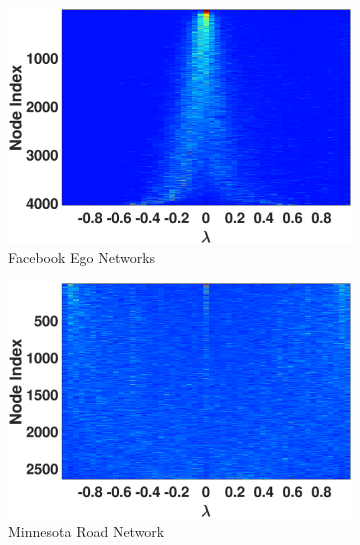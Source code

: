 \begin{figure}[ht]
\begin{subfigure}[t]{0.19\textwidth}
    \includegraphics[width=\textwidth,trim = .4cm 0.5cm 3.5cm 1.3cm,clip]
    {./ndos/pics/facebook_ldos}
    \caption{Facebook Ego Networks}
    \label{fig:facebook_ldos}
  \end{subfigure}
  \begin{subfigure}[t]{0.19\textwidth}
    \centering  
    \captionsetup{justification=centering,font=scriptsize}
    \includegraphics[width=\textwidth,trim = .4cm 0.5cm 3.5cm 1.3cm,clip]
    {./ndos/pics/minnesota_ldos}
    \caption{Minnesota Road Network}
    \label{fig:minnesota_ldos}
  \end{subfigure}
  \begin{subfigure}[t]{0.19\textwidth}
    \centering  
    \captionsetup{justification=centering,font=scriptsize}

\end{subfigure}
\end{figure}
